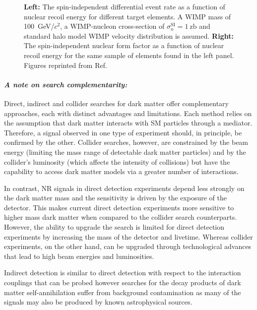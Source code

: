 \begin{figure}[!ht]
\begin{subfigure}{0.49\textwidth}
         \caption{}
         \label{fig:DMOverview/SIFF}
     \end{subfigure}
     \caption[B]{\textbf{Left:} The spin-independent differential event rate as a function of nuclear recoil energy for different target elements. A WIMP mass of 100~GeV/$c^2$, a WIMP-nucleon cross-section of $\sigma^\text{SI}_n=1~\text{zb}$ and standard halo model WIMP velocity distribution is assumed. \textbf{Right:} The spin-independent nuclear form factor as a function of nuclear recoil energy for the same sample of elements found in the left panel. Figures reprinted from Ref.~\cite{OlcinaSamblas:thesis}}
     \label{fig:DMOverview/SINRRandFF}
\end{figure}

\paragraph{\textit{A note on search complementarity:}} Direct, indirect and collider searches for dark matter offer complementary approaches, each with distinct advantages and limitations. Each method relies on the assumption that dark matter interacts with SM particles through a mediator. Therefore, a signal observed in one type of experiment should, in principle, be confirmed by the other. Collider searches, however, are constrained by the beam energy (limiting the mass range of detectable dark matter particles) and by the collider's luminosity (which affects the intensity of collisions) but have the capability to access dark matter models via a greater number of interactions.

In contrast, NR signals in direct detection experiments depend less strongly on the dark matter mass and the sensitivity is driven by the exposure of the detector. This makes current direct detection experiments more sensitive to higher mass dark matter when compared to the collider search counterparts. However, the ability to upgrade the search is limited for direct detection experiments by increasing the mass of the detector and livetime. Whereas collider experiments, on the other hand, can be upgraded through technological advances that lead to high beam energies and luminosities.

Indirect detection is similar to direct detection with respect to the interaction couplings that can be probed however searches for the decay products of dark matter self-annihilation suffer from background contamination as many of the signals may also be produced by known astrophysical sources.


